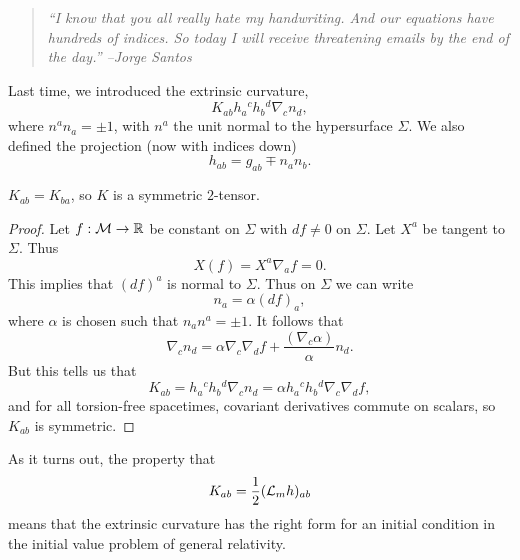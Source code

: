 \begin{quote}
    \textit{``I know that you all really hate my handwriting. And our equations have hundreds of indices. So today I will receive threatening emails by the end of the day.'' --Jorge Santos}
\end{quote}

Last time, we introduced the extrinsic curvature,
\begin{equation}
    K_{ab} h_a{}^c h_b{}^d \nabla_c n_d,
\end{equation}
where $n^a n_a= \pm1$, with $n^a$ the unit normal to the hypersurface $\Sigma$. We also defined the projection (now with indices down)
\begin{equation}
    h_{ab}=g_{ab} \mp n_a n_b.
\end{equation}
\begin{lem}
    $K_{ab}=K_{ba}$, so $K$ is a symmetric $2$-tensor.
\end{lem}
\begin{proof}
    Let $f:\mathcal{M} \to \mathbb{R}$ be constant on $\Sigma$ with $df\neq 0$ on $\Sigma$. Let $X^a$ be tangent to $\Sigma$. Thus
    \begin{equation}
        X(f)=X^a \nabla_a f=0.
    \end{equation}
    This implies that $(df)^a$ is normal to $\Sigma$.
    Thus on $\Sigma$ we can write
    \begin{equation}
        n_a = \alpha(df)_{a},
    \end{equation}
    where $\alpha$ is chosen such that $n_a n^a = \pm 1$. It follows that
    \begin{equation}
        \nabla_c n_d = \alpha \nabla_c \nabla_d f +\frac{(\nabla_c \alpha)}{\alpha} n_d.
    \end{equation}
    But this tells us that
    \begin{equation}
        K_{ab}=h_a{}^c h_b{}^d \nabla_c n_d = \alpha h_a{}^c h_b{}^d \nabla_c \nabla_d f,
    \end{equation}
    and for all torsion-free spacetimes, covariant derivatives commute on scalars, so $K_{ab}$ is symmetric.
\end{proof}

As it turns out, the property that
\begin{equation}
    K_{ab}=\frac{1}{2}(\mathcal L_m h)_{ab}
\end{equation}
means that the extrinsic curvature has the right form for an initial condition in the initial value problem of general relativity.

